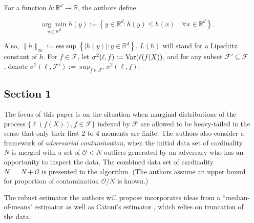 For a function \(h: \mathbb{R}^d \to \mathbb{R}\), the authors define

\[
\underset{y \in \mathbb{R}^d}{\arg \min} h(y) := \left\{y \in \mathbb{R}^d: h(y) \leq h(x) \quad \forall x \in \mathbb{R}^d \right\}.
\]

Also, \(\lVert h \rVert_\infty := \text{ess} \sup \left\{|h(y)|: y \in \mathbb{R}^d \right\}\). \(L(h)\) will stand for a Lipschitz constant of \(h\). For \(f \in \mathcal{F}\), let \(\sigma^2(\ell, f) := \mathrm{Var}(\ell(f(X))\), and for any subset \(\mathcal{F}' \subseteq \mathcal{F}\), denote \(\sigma^2(\ell, \mathcal{F}') := \sup_{f \in \mathcal{F}'} \sigma^2(\ell, f)\).




\subsection{Section 1}

The focus of this paper is on the situation when marginal distributions of the process \(\{\ell(f(X)), f \in \mathcal{F}\}\) indexed by \(\mathcal{F}\) are allowed to be heavy-tailed in the sense that only their first 2 to 4 moments are finite. The authors also consider a framework of \textit{adversarial contamination}, when the initial data set of cardinality \(N\) is merged with a set of \(\mathcal{O} < N \) outliers generated by an adversary who has an opportunity to inspect the data. The combined data set of cardinality \(N^\circ = N + \mathcal{O}\) is presented to the algorithm. (The authors assume an upper bound for proportion of contamination \(\mathcal{O}/N\) is known.)

The robust estimator the authors will propose incorporates ideas from a ``median-of-means" estimator as well as Catoni's estimator \citep{Catoni2012}, which relies on truncation of the data.

